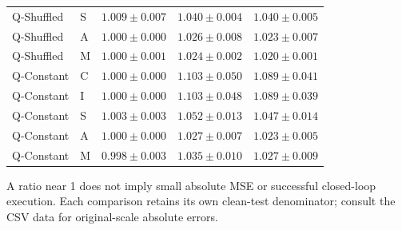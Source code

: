 \documentclass[11pt,a4paper]{article}
\newcommand{\note}[1]{\begin{tcolorbox}[colback=panel,colframe=rule,boxrule=0.5pt,arc=1mm]#1\end{tcolorbox}}
\begin{document}
\begin{center}
\begin{tabular}{llrrr}
Q-Shuffled & S & $1.009\pm0.007$ & $1.040\pm0.004$ & $1.040\pm0.005$ \\
Q-Shuffled & A & $1.000\pm0.000$ & $1.026\pm0.008$ & $1.023\pm0.007$ \\
Q-Shuffled & M & $1.000\pm0.001$ & $1.024\pm0.002$ & $1.020\pm0.001$ \\
Q-Constant & C & $1.000\pm0.000$ & $1.103\pm0.050$ & $1.089\pm0.041$ \\
Q-Constant & I & $1.000\pm0.000$ & $1.103\pm0.048$ & $1.089\pm0.039$ \\
Q-Constant & S & $1.003\pm0.003$ & $1.052\pm0.013$ & $1.047\pm0.014$ \\
Q-Constant & A & $1.000\pm0.000$ & $1.027\pm0.007$ & $1.023\pm0.005$ \\
Q-Constant & M & $0.998\pm0.003$ & $1.035\pm0.010$ & $1.027\pm0.009$ \\
\bottomrule
\end{tabular}
\end{center}
\note{A ratio near 1 does not imply small absolute MSE or successful closed-loop execution. Each comparison retains its own clean-test denominator; consult the CSV data for original-scale absolute errors.}
\end{document}
